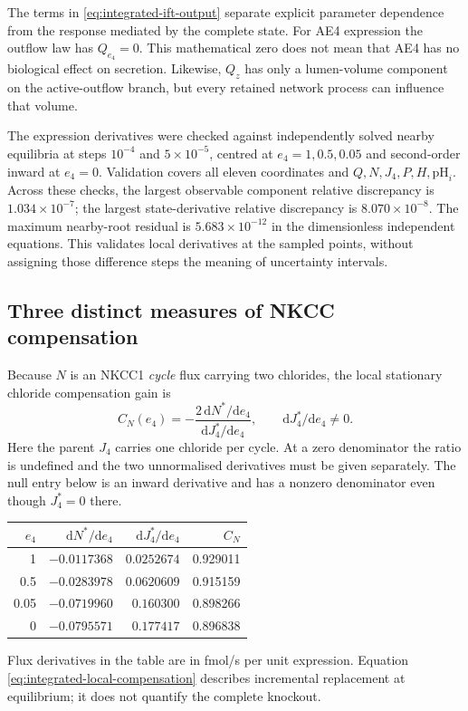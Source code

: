 The terms in \eqref{eq:integrated-ift-output} separate explicit parameter
dependence from the response mediated by the complete state. For AE4
expression the outflow law has $Q_{e_4}=0$. This mathematical zero does not
mean that AE4 has no biological effect on secretion. Likewise, $Q_z$ has
only a lumen-volume component on the active-outflow branch, but every
retained network process can influence that volume.

The expression derivatives were checked against independently solved nearby
equilibria at steps $10^{-4}$ and $5\times10^{-5}$, centred at
$e_4=1,0.5,0.05$ and second-order inward at $e_4=0$. Validation covers all
eleven coordinates and $Q,N,J_4,P,H,\mathrm{pH}_i$. Across these checks,
the largest observable component relative discrepancy is
$1.034\times10^{-7}$; the largest state-derivative relative discrepancy is
$8.070\times10^{-8}$. The maximum nearby-root residual is
$5.683\times10^{-12}$ in the dimensionless independent equations.
This validates local derivatives at the sampled points, without assigning
those difference steps the meaning of uncertainty intervals.

\subsection{Three distinct measures of NKCC compensation}
Because $N$ is an NKCC1 \emph{cycle} flux carrying two chlorides, the local
stationary chloride compensation gain is
\begin{equation}
 C_N(e_4)=-\frac{2\,\mathrm dN^*/\mathrm de_4}
                  {\mathrm dJ_4^*/\mathrm de_4},
 \qquad \mathrm dJ_4^*/\mathrm de_4\ne0.
 \label{eq:integrated-local-compensation}
\end{equation}
Here the parent $J_4$ carries one chloride per cycle. At a zero denominator
the ratio is undefined and the two unnormalised derivatives must be given
separately. The null entry below is an inward derivative and has a nonzero
denominator even though $J_4^*=0$ there.
\begin{center}
\begin{tabular}{rrrr}\hline
$e_4$ & $\mathrm dN^*/\mathrm de_4$ & $\mathrm dJ_4^*/\mathrm de_4$ & $C_N$\\\hline
1 & $-0.0117368$ & $0.0252674$ & 0.929011\\
0.5 & $-0.0283978$ & $0.0620609$ & 0.915159\\
0.05 & $-0.0719960$ & $0.160300$ & 0.898266\\
0 & $-0.0795571$ & $0.177417$ & 0.896838\\\hline
\end{tabular}
\end{center}
Flux derivatives in the table are in fmol/s per unit expression.
Equation \eqref{eq:integrated-local-compensation} describes incremental
replacement at equilibrium; it does not quantify the complete knockout.

